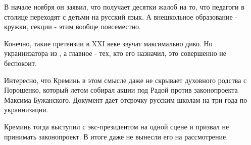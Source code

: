 В начале ноября он заявил, что получает десятки жалоб на то, что педагоги в
столице переходят с детьми на русский язык. А внешкольное образование - кружки,
секции -  этим вообще повсеместно. 

Конечно, такие претензии в XXІ веке звучат максимально дико. Но украинизатора
из , а главное - тех, кто его назначил, это совершенно не
беспокоит. 

Интересно, что Креминь в этом смысле даже не скрывает духовного родства с
Порошенко, который летом собирал акции под Радой против законопроекта  Максима Бужанского. Документ дает отсрочку русским школам на три года
по украинизации.

Креминь тогда выступил с экс-президентом на одной сцене и призвал не принимать
законопроект. В итоге  даже не вынесли его на рассмотрение. 




